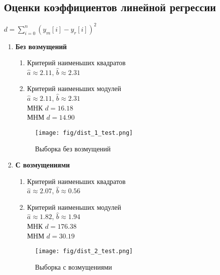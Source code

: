 \subsection{Оценки коэффициентов линейной регрессии}
$d = \sum_{i = 0}^{n}{(y_{m}[i] - y_{r}[i])^2}$
\begin{enumerate}
    \item \textbf{Без возмущений}
        \begin{enumerate}
            \item Критерий наименьших квадратов\\
            $\hat{a} \approx 2.11$, $\hat{b} \approx 2.31$\\
            \item Критерий наименьших модулей \\
            $\hat{a} \approx 2.11$, $\hat{b} \approx 2.31$  \\
            МНК $d = 16.18$\\
            МНМ $d = 14.90$\\
        \end{enumerate}

        \begin{figure}[H]
            \centering
            \texttt{[image: fig/dist\_1\_test.png]}
            \caption{Выборка без возмущений}
            \label{fig:enter-label}
        \end{figure}
    \item \textbf{С возмущениями}
        \begin{enumerate}
            \item Критерий наименьших квадратов\\
            $\hat{a} \approx 2.07$, $\hat{b} \approx 0.56$\\
            \item Критерий наименьших модулей\\ 
            $\hat{a} \approx 1.82$, $\hat{b} \approx 1.94$  \\
            МНК $d = 176.38$\\
            МНМ $d = 30.19$\\
        \end{enumerate}
        
        \begin{figure}[H]
            \centering
            \texttt{[image: fig/dist\_2\_test.png]}
            \caption{Выборка с возмущениями}
            \label{fig:enter-label}
        \end{figure}  
\end{enumerate}
